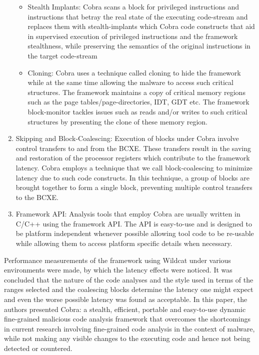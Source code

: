 \documentclass[11pt]{article}
\begin{document}
\begin{enumerate}
\begin{itemize}
				\item Stealth Implants: Cobra scans a block for privileged instructions and instructions that betray the real state of the executing code-stream and replaces them with stealth-implants which Cobra code constructs that aid in supervised execution of privileged instructions and the framework stealthness, while preserving the semantics of the original instructions in the target code-stream
				\item Cloning: Cobra uses a technique called cloning to hide the framework while at the same time allowing the malware to access such critical structures. The framework maintains a copy of critical memory regions such as the page tables/page-directories, IDT, GDT etc. The framework block-monitor tackles issues such as reads and/or writes to such critical structures by presenting the clone of these memory region.
			\end{itemize}
			\item Skipping and Block-Coalescing: Execution of blocks under Cobra involve control transfers to and from the BCXE. These transfers result in the saving and restoration of the processor registers which contribute to the framework latency. Cobra employs a technique that we call block-coalescing to minimize latency due to such code constructs. In this technique, a group of blocks are brought together to form a single block, preventing multiple control transfers to the BCXE.
			\item Framework API: Analysis tools that employ Cobra are usually written in C/C++ using the framework API. The API is easy-to-use and is designed to be platform independent whenever possible allowing tool code to be re-usable while allowing them to access platform specific details when necessary.
		\end{enumerate}	
	Performance measurements of the framework using Wildcat under various environments were made, by which the latency effects were noticed. It was concluded that the nature of the code analyses and the style used in terms of the ranges selected and the coalescing blocks determine the latency one might expect and even the worse possible latency was found as acceptable.
	In this paper, the authors presented Cobra: a stealth, efficient, portable and easy-to-use dynamic fine-grained malicious code analysis framework that overcomes the shortcomings in current research involving fine-grained code analysis in the context of malware, while not making any visible changes to the executing code and hence not being detected or countered.
\end{document}
